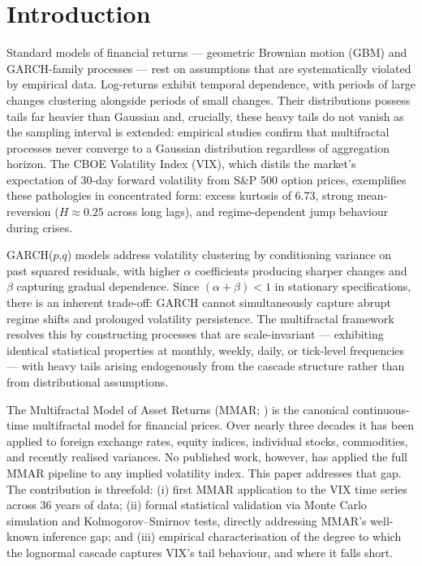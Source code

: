 \documentclass[12pt,a4paper]{article}
\begin{document}
\section{Introduction}

Standard models of financial returns --- geometric Brownian motion (GBM)
and GARCH-family processes --- rest on assumptions that are
systematically violated by empirical data. Log-returns exhibit temporal
dependence, with periods of large changes clustering alongside periods
of small changes. Their distributions possess tails far heavier than
Gaussian and, crucially, these heavy tails do not vanish as the sampling
interval is extended: empirical studies confirm that multifractal
processes never converge to a Gaussian distribution regardless of
aggregation horizon. The CBOE Volatility Index (VIX), which distils
the market's expectation of 30-day forward volatility from S\&P 500
option prices, exemplifies these pathologies in concentrated form:
excess kurtosis of 6.73, strong mean-reversion ($H \approx 0.25$
across long lags), and regime-dependent jump behaviour during crises.

GARCH($p$,$q$) models \citep{bollerslev1986} address volatility
clustering by conditioning variance on past squared residuals, with
higher $\alpha$ coefficients producing sharper changes and $\beta$
capturing gradual dependence. Since $(\alpha + \beta) < 1$ in
stationary specifications, there is an inherent trade-off: GARCH
cannot simultaneously capture abrupt regime shifts and prolonged
volatility persistence. The multifractal framework resolves this by
constructing processes that are scale-invariant --- exhibiting identical
statistical properties at monthly, weekly, daily, or tick-level
frequencies --- with heavy tails arising endogenously from the cascade
structure rather than from distributional assumptions.

The Multifractal Model of Asset Returns (MMAR;
\citealt{mandelbrot1997}) is the canonical continuous-time multifractal
model for financial prices. Over nearly three decades it has been
applied to foreign exchange rates, equity indices, individual stocks,
commodities, and recently realised variances. No published work,
however, has applied the full MMAR pipeline to any implied volatility
index. This paper addresses that gap. The contribution is threefold:
(i) first MMAR application to the VIX time series across 36 years of
data; (ii) formal statistical validation via Monte Carlo simulation and
Kolmogorov--Smirnov tests, directly addressing MMAR's well-known
inference gap; and (iii) empirical characterisation of the degree to
which the lognormal cascade captures VIX's tail behaviour, and where
it falls short.
\end{document}
